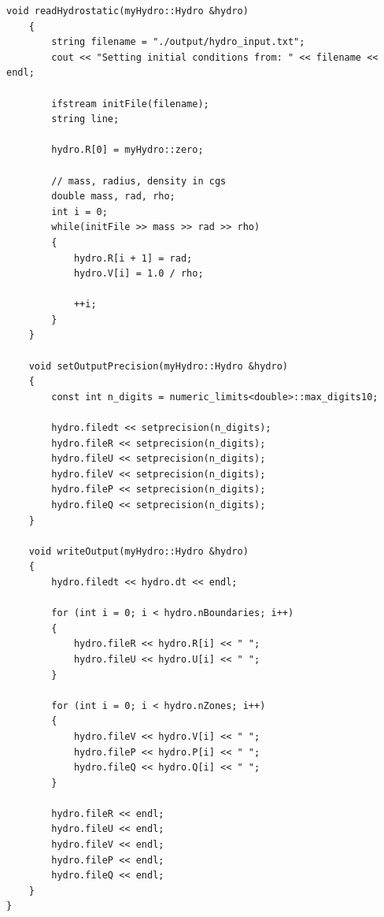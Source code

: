 \documentclass[12pt]{article}
\begin{document}
\begin{Verbatim}[fontsize=\small]
    void readHydrostatic(myHydro::Hydro &hydro)
    {
        string filename = "./output/hydro_input.txt";
        cout << "Setting initial conditions from: " << filename << endl;

        ifstream initFile(filename);
        string line;

        hydro.R[0] = myHydro::zero;

        // mass, radius, density in cgs
        double mass, rad, rho;
        int i = 0;
        while(initFile >> mass >> rad >> rho)
        {
            hydro.R[i + 1] = rad;
            hydro.V[i] = 1.0 / rho;

            ++i;
        }
    }

    void setOutputPrecision(myHydro::Hydro &hydro)
    {
        const int n_digits = numeric_limits<double>::max_digits10;

        hydro.filedt << setprecision(n_digits);
        hydro.fileR << setprecision(n_digits);
        hydro.fileU << setprecision(n_digits);
        hydro.fileV << setprecision(n_digits);
        hydro.fileP << setprecision(n_digits);
        hydro.fileQ << setprecision(n_digits);
    }

    void writeOutput(myHydro::Hydro &hydro)
    {
        hydro.filedt << hydro.dt << endl;

        for (int i = 0; i < hydro.nBoundaries; i++)
        {
            hydro.fileR << hydro.R[i] << " ";
            hydro.fileU << hydro.U[i] << " ";
        }

        for (int i = 0; i < hydro.nZones; i++)
        {
            hydro.fileV << hydro.V[i] << " ";
            hydro.fileP << hydro.P[i] << " ";
            hydro.fileQ << hydro.Q[i] << " ";
        }

        hydro.fileR << endl;
        hydro.fileU << endl;
        hydro.fileV << endl;
        hydro.fileP << endl;
        hydro.fileQ << endl;
    }
}
\end{Verbatim}
\end{document}

